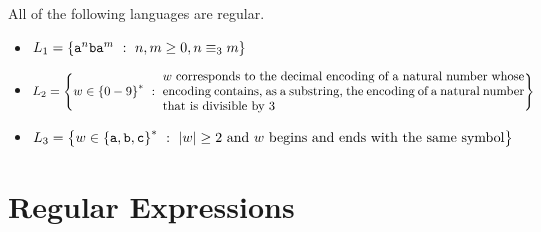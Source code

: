 \documentclass[twoside,letterpaper,openany]{book}
\begin{document}
\begin{stmt2}\label{stmt:nfas}
All of the following languages are regular.
\begin{itemize}
\item $L_1 = \left\lbrace {\texttt{a}}^n{\texttt{b}}{\texttt{a}}^m\ :\ n, m \geq 0, n \equiv_3 m \right\rbrace$
\item $L_2 = \setbuild{w\in\setstar{\setdef{0-9}}}{
\parbox{4in}{$w$~corresponds to the decimal encoding of a natural number whose encoding contains, as a substring,
			the encoding of a natural number that is divisible by 3}
			}$
\item $L_3 = \setbuild{w\in\setstar{\setdef{\charA, \charB, \texttt{c}}}}{|w| \geq 2\ \textrm{and}\ w\ \textrm{begins and ends with the same symbol}}$


\end{itemize}
\end{stmt2}




\section{Regular Expressions}\label{sec:regexp}
\end{document}
